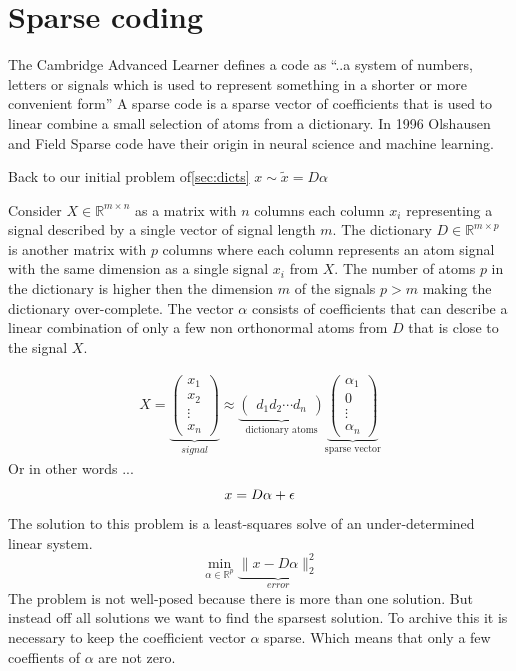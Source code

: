\chapter{Sparse coding}
\label{chap:sparse_coding}

The Cambridge Advanced Learner defines a code as ``..a system of numbers,
letters or signals which is used to represent something in a shorter or more
convenient form'' A sparse code is a sparse vector of coefficients that is used
to linear combine a small selection of atoms from a dictionary. In 
1996 Olshausen and Field\cite{Olshausen1996} Sparse code have
their origin in neural science and machine learning.

Back to our initial problem of\ref{sec:dicts} $x \sim \tilde{x} = D\alpha$


Consider $X \in \mathbb{R}^{m\times n}$  as a matrix with $n$ columns each
column $x_{i}$ representing a signal described by a single vector of
signal length $m$. The dictionary $D\in\mathbb{R}^{m \times p}$ is another
matrix with $p$ columns where each column represents an atom signal with the
same dimension as a single signal $x_{i}$ from $X$. The number of 
atoms $p$ in the dictionary is higher then the dimension $m$ of the signals
$p > m$ making the dictionary over-complete. The vector $\alpha$ consists of
coefficients that can describe a linear combination of only a few non
orthonormal atoms from $D$ that is close to the signal $X$. 

\begin{align}
X = \underbrace{\begin{pmatrix} x_1 \\ x_2 \\ \vdots \\ x_n
\end{pmatrix}}_{signal}
\approx \underbrace{\begin{pmatrix} d_1  d_2 \cdots d_n
\end{pmatrix}}_{\textrm{dictionary atoms}}
\underbrace{\begin{pmatrix} \alpha_1 \\ 0 \\ \vdots \\ \alpha_n
\end{pmatrix}}_{\textrm{sparse vector}}
\end{align}
Or in other words ...
\begin{equation}
x = D\alpha+\epsilon \notag\\
\end{equation}
The solution to this problem is a least-squares solve of an under-determined
linear system.
\begin{equation}
\min_{\alpha\in\mathbb{R}^{p}} \underbrace{\lVert x - D\alpha
\rVert^{2}_{2}}_{error} \label{eq:problem}
\end{equation}
The problem is not well-posed because there is more than one
solution. But instead off all solutions we want to find the sparsest solution. 
To archive this it is necessary to keep the coefficient vector $\alpha$ sparse.
Which means that only a few coeffients of $\alpha$ are not zero. 

